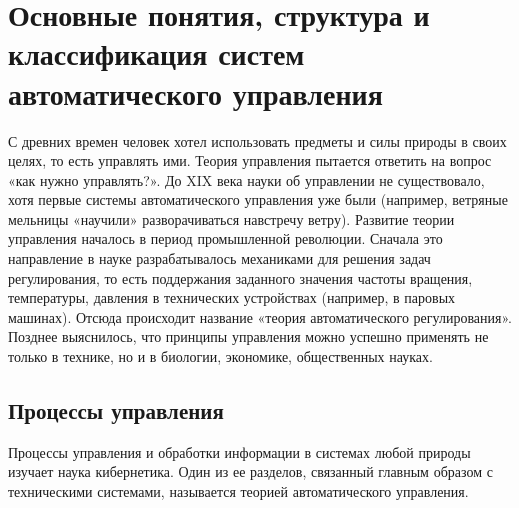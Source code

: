 \documentclass[../../TAU.tex]{subfiles}
\begin{document}
\chapter{Основные понятия, структура и классификация систем автоматического управления}

    С древних времен человек хотел использовать предметы и силы природы в своих целях, то есть управлять ими. Теория управления пытается ответить на вопрос «как нужно управлять?». До XIX века науки об управлении не существовало, хотя первые системы автоматического управления уже были (например, ветряные мельницы «научили» разворачиваться навстречу ветру). Развитие теории управления началось в период промышленной революции. Сначала это направление в науке разрабатывалось механиками для решения задач регулирования, то есть поддержания заданного значения частоты вращения, температуры, давления в технических устройствах (например, в паровых машинах). Отсюда происходит название «теория автоматического регулирования». Позднее выяснилось, что принципы управления можно успешно применять не только в технике, но и в биологии, экономике, общественных науках.

\pagebreak 
\hspace{0pt}
\linebreak

\section {Процессы управления}

    Процессы управления и обработки информации в системах любой природы изучает наука кибернетика. Один из ее разделов, связанный главным образом с техническими системами, называется теорией автоматического управления. 
\end{document}
